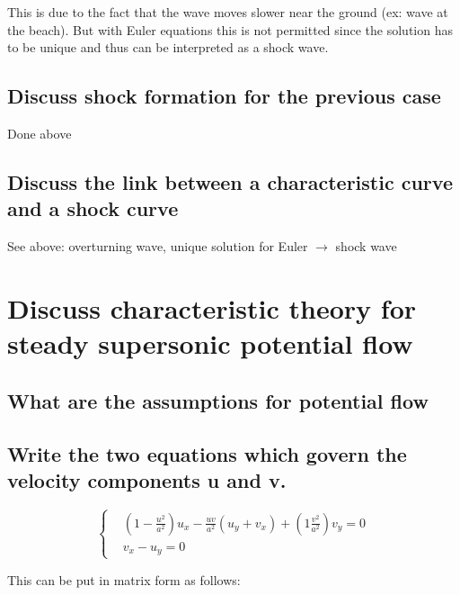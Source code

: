 \documentclass[british,french,11pt, a4paper, openany]{article}
\begin{document}
	This is due to the fact that the wave moves slower near the ground (ex: wave at the beach). But with Euler equations this is not permitted since the solution has to be unique and thus can be interpreted as a shock wave. 


\subsection{Discuss shock formation for the previous case}

Done above

\subsection{Discuss the link between a characteristic curve and a shock curve}

See above: overturning wave, unique solution for Euler $\rightarrow$ shock wave



\section{Discuss characteristic theory for steady supersonic potential flow}
\subsection{What are the assumptions for potential flow}
\subsection{Write the two equations which govern the velocity components u and v.}

\begin{equation}
\left\{
\begin{aligned}
&\left( 1 - \frac{u^2}{a^2} \right) u_x - \frac{uv}{a^2} (u_y + v_x) + \left( 1  \frac{v^2}{a^2} \right) v_y = 0\\
& v_x - u_y = 0
\end{aligned}
\right.
\end{equation}

	This can be put in matrix form as follows: 
\end{document}
